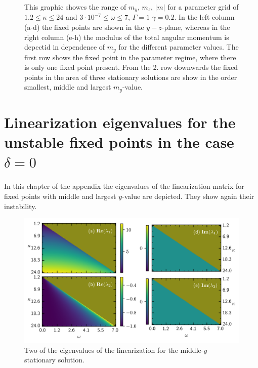 \begin{appendices}
\begin{figure}[H]
        \caption{This graphic showes the range of $m_y$, $m_z$, $|m|$ for a parameter grid of $1.2\leq\kappa\leq24$ and $3\cdot10^{-7}\leq\omega\leq7$, $\Gamma=1$ $\gamma=0.2$. In the left column (a-d) the fixed points are shown in the $y-z$-plane, whereas in the right column (e-h) the modulus of the total angular momentum is depectid in dependence of $m_y$ for the different parameter values. The first row shows the fixed point in the parameter regime, where there is only one fixed point present. From the 2. row downwards the fixed points in the area of three stationary solutions are show in the order smallest, middle and largest $m_y$-value.}
    \end{figure}
    
    
    
    \section{Linearization eigenvalues for the unstable fixed points in the case $\delta=0$}
    \label{appendix:eig_del0}
    In this chapter of the appendix the eigenvalues of the linearization matrix for fixed points with middle and largest $y$-value are depicted. They show again their instability.
    \begin{figure}[H]
        \centering
        \includegraphics{pictures/lam_anal_m1.png}
        \caption{Two of the eigenvalues of the linearization for the middle-$y$ stationary solution.
        }
    \end{figure}
    

\end{appendices}
